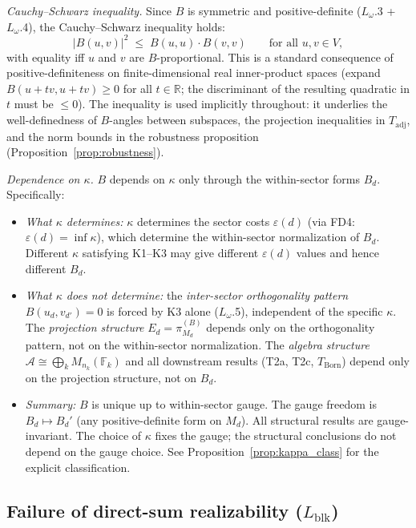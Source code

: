 \documentclass[11pt,a4paper]{article}
\theoremstyle{definition}
\newcommand{\eps}{\varepsilon}
\begin{document}
\smallskip\noindent
\textit{Cauchy--Schwarz inequality.}  Since $B$ is symmetric and positive-definite ($L_\omega$.3 + $L_\omega$.4), the Cauchy--Schwarz inequality holds:
\[
|B(u, v)|^2 \;\le\; B(u, u) \cdot B(v, v) \qquad \text{for all } u, v \in V,
\]
with equality iff $u$ and $v$ are $B$-proportional.  This is a standard consequence of positive-definiteness on finite-dimensional real inner-product spaces (expand $B(u + tv, u + tv) \ge 0$ for all $t \in \mathbb{R}$; the discriminant of the resulting quadratic in $t$ must be $\le 0$).  The inequality is used implicitly throughout: it underlies the well-definedness of $B$-angles between subspaces, the projection inequalities in $T_{\mathrm{adj}}$, and the norm bounds in the robustness proposition (Proposition~\ref{prop:robustness}).

\smallskip\noindent
\textit{Dependence on $\kappa$.}  $B$ depends on $\kappa$ only through the within-sector forms $B_d$.  Specifically:
\begin{itemize}[nosep,leftmargin=2em,itemsep=2pt]
\item \textit{What $\kappa$ determines:} $\kappa$ determines the sector costs $\eps(d)$ (via FD4: $\eps(d) = \inf \kappa$), which determine the within-sector normalization of $B_d$.  Different $\kappa$ satisfying K1--K3 may give different $\eps(d)$ values and hence different $B_d$.
\item \textit{What $\kappa$ does not determine:} the \emph{inter-sector orthogonality pattern} $B(u_d, v_{d'}) = 0$ is forced by K3 alone ($L_\omega$.5), independent of the specific $\kappa$.  The \emph{projection structure} $E_d = \pi_{M_d}^{(B)}$ depends only on the orthogonality pattern, not on the within-sector normalization.  The \emph{algebra structure} $\mathcal{A} \cong \bigoplus_k M_{n_k}(\mathbb{F}_k)$ and all downstream results (T2a, T2c, $T_{\mathrm{Born}}$) depend only on the projection structure, not on $B_d$.
\item \textit{Summary:} $B$ is unique up to within-sector gauge.  The gauge freedom is $B_d \mapsto B_d'$ (any positive-definite form on $M_d$).  All structural results are gauge-invariant.  The choice of $\kappa$ fixes the gauge; the structural conclusions do not depend on the gauge choice.  See Proposition~\ref{prop:kappa_class} for the explicit classification.
\end{itemize}

\subsection{Failure of direct-sum realizability ($L_{\mathrm{blk}}$)}
\end{document}

